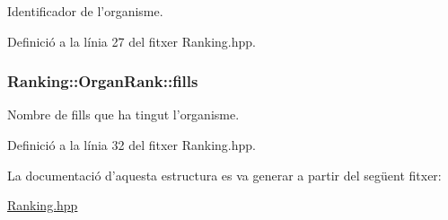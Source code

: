 Identificador de l'organisme. 



Definició a la línia 27 del fitxer Ranking.\-hpp.

\hypertarget{struct_ranking_1_1_organ_rank_a127f9a8768fd7cfda05c3cb2f9f8cfee}{
\subsubsection[{fills}]{\setlength{\rightskip}{0pt plus 5cm}Ranking\-::\-Organ\-Rank\-::fills}}\label{struct_ranking_1_1_organ_rank_a127f9a8768fd7cfda05c3cb2f9f8cfee}


Nombre de fills que ha tingut l'organisme. 



Definició a la línia 32 del fitxer Ranking.\-hpp.



La documentació d'aquesta estructura es va generar a partir del següent fitxer\-:\begin{DoxyCompactItemize}
\item 
\hyperlink{_ranking_8hpp}{Ranking.\-hpp}\end{DoxyCompactItemize}
